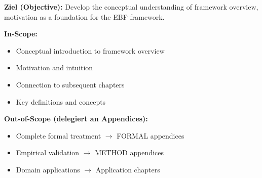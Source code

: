 %
%
%
%


\begin{tcolorbox}[
    colback=purple!5!white,
    colframe=purple!75!black,
    title={\textbf{Chapter Scope: Ziel / In-Scope / Out-of-Scope}},
    fonttitle=\bfseries
]

\textbf{Ziel (Objective):}
Develop the conceptual understanding of framework overview, motivation as a foundation for the EBF framework.

\vspace{0.3cm}
\textbf{In-Scope:}
\begin{itemize}[nosep]
    \item Conceptual introduction to framework overview
    \item Motivation and intuition
    \item Connection to subsequent chapters
    \item Key definitions and concepts
\end{itemize}

\vspace{0.3cm}
\textbf{Out-of-Scope (delegiert an Appendices):}
\begin{itemize}[nosep]
    \item Complete formal treatment $\rightarrow$ FORMAL appendices
    \item Empirical validation $\rightarrow$ METHOD appendices
    \item Domain applications $\rightarrow$ Application chapters
\end{itemize}

\end{tcolorbox}



